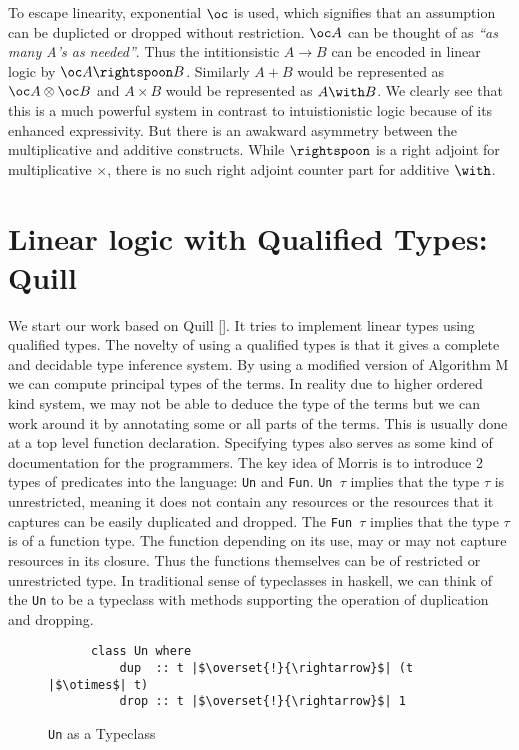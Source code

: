 To escape linearity, exponential $\oc$ is used, which signifies that an assumption can
be duplicted or dropped without restriction. $\oc A$ can be thought of as {\em``as many A's as needed''}.
Thus the intitionsistic $A \rightarrow B$ can be encoded in linear logic by $\oc A \rightspoon B$.
Similarly $A \plus B$ would be represented as $\oc A \otimes \oc B$ and $A \times B$ would be represented as $A \with B$.
We clearly see that this is a much powerful system in contrast to intuistionistic logic because of its enhanced expressivity.
But there is an awakward asymmetry between the multiplicative and additive constructs. While $\rightspoon$ is a right adjoint
for multiplicative $\times$, there is no such right adjoint counter part for additive $\with$.
\section{Linear logic with Qualified Types: Quill}
We start our work based on Quill [\cite{morris_best_2016}]. It tries
to implement linear types using qualified types. The novelty of using a qualified
types is that it gives a complete and decidable type inference system. By using
a modified version of Algorithm M we can compute principal types of the terms.
In reality due to higher ordered kind system, we may not be able to deduce the
type of the terms but we can work around it by annotating some or all parts of
the terms. This is usually done at a top level function declaration. Specifying types
also serves as some kind of documentation for the programmers.
The key idea of Morris is to introduce 2 types of predicates into the language: \texttt{Un} and \texttt{Fun}.
\texttt{Un $\tau$} implies that the type $\tau$ is unrestricted, meaning it does not
contain any resources or the resources that it captures can be easily duplicated and dropped.
The \texttt{Fun $\tau$} implies that the type $\tau$ is of a function type. The function
depending on its use, may or may not capture resources in its closure. Thus the functions
themselves can be of restricted or unrestricted type. In traditional sense of typeclasses
in haskell, we can think of the \texttt{Un} to be a typeclass with methods supporting the operation
of duplication and dropping.
\begin{figure}[h]
  \centering
  \begin{framed}
    \begin{verbatim}
      class Un where
          dup  :: t |$\overset{!}{\rightarrow}$| (t |$\otimes$| t)
          drop :: t |$\overset{!}{\rightarrow}$| 1
    \end{verbatim}
  \end{framed}
  \caption{\texttt{Un} as a Typeclass}
  \label{fig:un-typeclass}
\end{figure}


